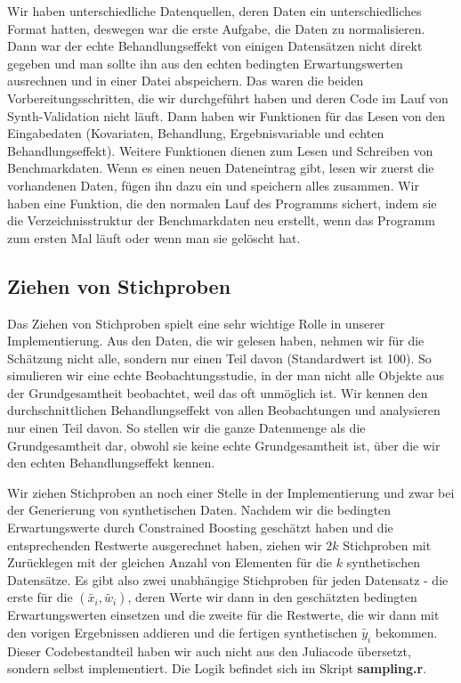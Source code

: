 \documentclass[12pt,a4paper,twoside]{scrartcl}
\numberwithin{equation}{section}
\begin{document}
\noindent
Wir haben unterschiedliche Datenquellen, deren Daten ein unterschiedliches Format hatten, deswegen war die erste Aufgabe, die Daten zu normalisieren. Dann war der echte Behandlungseffekt von einigen Datensätzen nicht direkt gegeben und man sollte ihn aus den echten bedingten Erwartungswerten ausrechnen und in einer Datei abspeichern. Das waren die beiden Vorbereitungsschritten, die wir durchgeführt haben und deren Code im Lauf von Synth-Validation nicht läuft. Dann haben wir Funktionen für das Lesen von den Eingabedaten (Kovariaten, Behandlung, Ergebnisvariable und echten Behandlungseffekt). Weitere Funktionen dienen zum Lesen und Schreiben von Benchmarkdaten. Wenn es einen neuen Dateneintrag gibt, lesen wir zuerst die vorhandenen Daten, fügen ihn dazu ein und speichern alles zusammen. Wir haben eine Funktion, die den normalen Lauf des Programms sichert, indem sie die Verzeichnisstruktur der Benchmarkdaten neu erstellt, wenn das Programm zum ersten Mal läuft oder wenn man sie gelöscht hat.\par

\subsection{Ziehen von Stichproben}\label{subsec:ziehenStichproben}
Das Ziehen von Stichproben spielt eine sehr wichtige Rolle in unserer Implementierung. Aus den Daten, die wir gelesen haben, nehmen wir für die Schätzung nicht alle, sondern nur einen Teil davon (Standardwert ist 100). So simulieren wir eine echte Beobachtungsstudie, in der man nicht alle Objekte aus der Grundgesamtheit beobachtet, weil das oft unmöglich ist. Wir kennen den durchschnittlichen Behandlungseffekt von allen Beobachtungen und analysieren nur einen Teil davon. So stellen wir die ganze Datenmenge als die Grundgesamtheit dar, obwohl sie keine echte Grundgesamtheit ist, über die wir den echten Behandlungseffekt kennen.\par

\noindent
Wir ziehen Stichproben an noch einer Stelle in der Implementierung und zwar bei der Generierung von synthetischen Daten. Nachdem wir die bedingten Erwartungswerte durch Constrained Boosting geschätzt haben und die entsprechenden Restwerte ausgerechnet haben, ziehen wir $2k$ Stichproben mit Zurücklegen mit der gleichen Anzahl von Elementen für die $k$ synthetischen Datensätze. Es gibt also zwei unabhängige Stichproben für jeden Datensatz - die erste für die $(\tilde{x_i},\tilde{w_i})$, deren Werte wir dann in den geschätzten bedingten Erwartungswerten einsetzen und die zweite für die Restwerte, die wir dann mit den vorigen Ergebnissen addieren und die fertigen synthetischen $\tilde{y_i}$ bekommen. Dieser Codebestandteil haben wir auch nicht aus den Juliacode übersetzt, sondern selbst implementiert. Die Logik befindet sich im Skript \textbf{sampling.r}.
\end{document}
